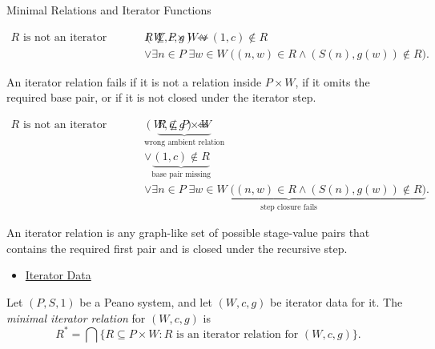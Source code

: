 \begin{topicbox}{Minimal Relations and Iterator Functions}

\begin{remark*}
\[
\begin{aligned}
R \text{ is not an iterator relation for } (W,c,g)
\Longleftrightarrow\;&
R\not\subseteq P\times W
\lor (1,c)\notin R\\
&\lor \exists n\in P\;\exists w\in W\;
\bigl((n,w)\in R\land (S(n),g(w))\notin R\bigr).
\end{aligned}
\]
\end{remark*}

\begin{remark*}
An iterator relation fails if it is not a relation inside $P\times W$, if it
omits the required base pair, or if it is not closed under the iterator step.
\end{remark*}

\begin{remark*}
\[
\begin{aligned}
R \text{ is not an iterator relation for } (W,c,g)
\Longleftrightarrow\;&
\underbrace{R\not\subseteq P\times W}_{\text{wrong ambient relation}}\\
&\lor \underbrace{(1,c)\notin R}_{\text{base pair missing}}\\
&\lor \underbrace{\exists n\in P\;\exists w\in W\;
\bigl((n,w)\in R\land (S(n),g(w))\notin R\bigr)}_{\text{step closure fails}}.
\end{aligned}
\]
\end{remark*}

\begin{remark*}[Interpretation]
An iterator relation is any graph-like set of possible stage-value pairs that
contains the required first pair and is closed under the recursive step.
\end{remark*}

\begin{remark*}[Dependencies]
\begin{itemize}
  \item \hyperref[def:iterator-data-on-peano-system]{Iterator Data}
\end{itemize}
\end{remark*}

\begin{tcolorbox}[colback=defbox, colframe=defborder, arc=2pt,
  left=6pt, right=6pt, top=4pt, bottom=4pt,
  title={\small\textbf{Definition (Minimal Iterator Relation)}},
  fonttitle=\small\bfseries]
\begin{definition}
\label{def:minimal-iterator-relation}
Let $(P,S,1)$ be a Peano system, and let $(W,c,g)$ be iterator data for it.
The \emph{minimal iterator relation} for $(W,c,g)$ is
\[
R^*
=
\bigcap\{R\subseteq P\times W : R \text{ is an iterator relation for }
(W,c,g)\}.
\]
\end{definition}
\end{tcolorbox}


\end{topicbox}
